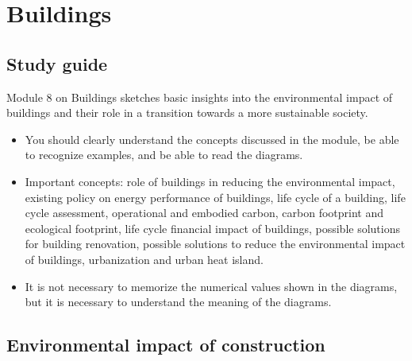 \documentclass[../summary.tex]{subfiles}
\begin{document}
	
	\section{Buildings}
	
	\subsection{Study guide}
	
	Module 8 on Buildings sketches basic insights into the environmental impact of buildings and their role in a transition towards a more sustainable society. 
	
	\begin{itemize}
		\item You should clearly understand the concepts discussed in the module, be able to recognize examples, and be able to read the diagrams.
		\item Important concepts: role of buildings in reducing the environmental impact, existing policy on energy performance of buildings, life cycle of a building, life cycle assessment, operational and embodied carbon, carbon footprint and ecological footprint, life cycle financial impact of buildings, possible solutions for building renovation, possible solutions to reduce the environmental impact of buildings, urbanization and urban heat island.
		\item It is not necessary to memorize the numerical values shown in the diagrams, but it is necessary to understand the meaning of the diagrams.
	\end{itemize}
	
	\subsection{Environmental impact of construction}
	
\end{document}
